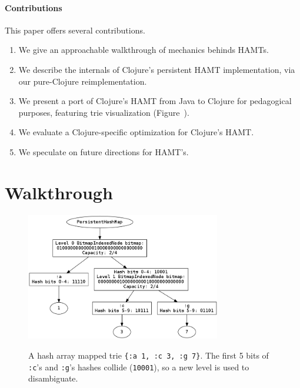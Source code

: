\documentclass[preprint]{sigplanconf}
\begin{document}
\paragraph{Contributions}
This paper offers several contributions.

\begin{enumerate}
  \item We give an approachable walkthrough of mechanics behinds
      HAMTs.
  \item We describe the internals of Clojure's persistent HAMT implementation,
    via our pure-Clojure reimplementation.
  \item We present a port of Clojure's HAMT from Java to Clojure
    for pedagogical purposes,
    featuring trie visualization (Figure~\label{port-visualize}).
  \item We evaluate a Clojure-specific optimization for Clojure's HAMT.
  \item We speculate on future directions for HAMT's.
\end{enumerate}

\section{Walkthrough}
\label{walkthrough}

\begin{figure}
\includegraphics[width=8.5cm]{a-c-g-tree}
\label{port-visualize}
\caption{A hash array mapped trie \texttt{\{:a 1, :c 3, :g 7\}}.
The first 5 bits of \texttt{:c}'s and \texttt{:g}'s hashes
collide (\texttt{10001}), so a new level is used to disambiguate.
}
\end{figure}
\end{document}
